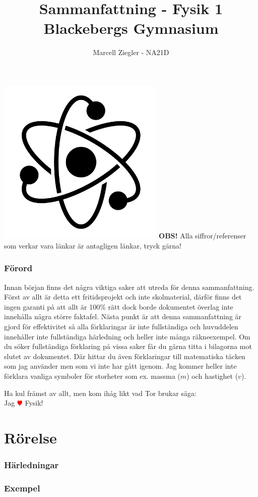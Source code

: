 \documentclass[12pt, a4paper]{article}
\title{Sammanfattning - Fysik 1 \\ Blackebergs Gymnasium}
\author{Marcell Ziegler - NA21D}
\theoremstyle{definition}
\begin{document}
    \begin{titlepage}
        \maketitle
        \centering
        \vfill
        \includegraphics[width=0.6\textwidth]{title.jpg}
        \vfill
        \textbf{OBS!} Alla siffror/referenser som verkar vara länkar är antagligen länkar, tryck gärna!
    \end{titlepage}

    \tableofcontents

    \newpage

    \section*{Förord}
    Innan början finns det några viktiga saker att utreda för denna sammanfattning. Först av allt är detta ett fritidsprojekt och inte skolmaterial, därför finns det ingen garanti på att allt är 100\% rätt dock borde dokumentet överlag inte innehålla några större faktafel. Nästa punkt är att denna sammanfattning är gjord för effektivitet så alla förklaringar är inte fullständiga och huvuddelen innehåller inte fullständiga härledning och heller inte många räkneexempel. Om du söker fullständiga förklaring på vissa saker får du gärna titta i bilagorna mot slutet av dokumentet. Där hittar du även förklaringar till matematiska täcken som jag använder men som vi inte har gått igenom. Jag kommer heller inte förklara vanliga symboler för storheter som ex. massma ($m$) och hastighet ($v$).
    \begin{center}
        \large{Ha kul främst av allt, men kom ihåg likt vad Tor brukar säga:}\\
        \Large{Jag \textcolor{red}{$\varheartsuit$} Fysik!}
    \end{center}

    \part{Rörelse}
    

    \newpage
    \appendix
    \section{Härledningar}
    \label{appendix:härledning}
    
    \section{Exempel}
    \label{appendix:exempel}
\end{document}
